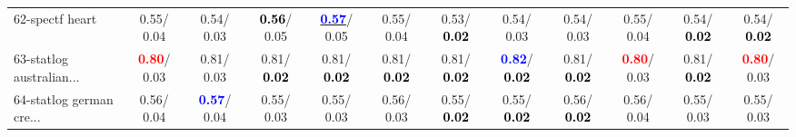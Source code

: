 \begin{table}[h]
\begin{center}
{\begin{tabular}{lc|c|c|c|c|c|c|c|c|c|c}
62-spectf heart &   0.55/  0.04 &   0.54/  0.03 & \textcolor{black}{\textbf{  0.56}}/  0.05 & \underline{\textcolor{blue}{\textbf{  0.57}}}/  0.05 &   0.55/  0.04 &   0.53/\textcolor{black}{\textbf{  0.02}} &   0.54/  0.03 &   0.54/  0.03 &   0.55/  0.04 &   0.54/\textcolor{black}{\textbf{  0.02}} &   0.54/\textcolor{black}{\textbf{  0.02}} \\
63-statlog australian... & \textcolor{red}{\textbf{  0.80}}/  0.03 &   0.81/  0.03 &   0.81/\textcolor{black}{\textbf{  0.02}} &   0.81/\textcolor{black}{\textbf{  0.02}} &   0.81/\textcolor{black}{\textbf{  0.02}} &   0.81/\textcolor{black}{\textbf{  0.02}} & \textcolor{blue}{\textbf{  0.82}}/\textcolor{black}{\textbf{  0.02}} &   0.81/\textcolor{black}{\textbf{  0.02}} & \textcolor{red}{\textbf{  0.80}}/  0.03 &   0.81/\textcolor{black}{\textbf{  0.02}} & \textcolor{red}{\textbf{  0.80}}/  0.03 \\
64-statlog german cre... &   0.56/  0.04 & \textcolor{blue}{\textbf{  0.57}}/  0.04 &   0.55/  0.03 &   0.55/  0.03 &   0.56/  0.03 &   0.55/\textcolor{black}{\textbf{  0.02}} &   0.55/\textcolor{black}{\textbf{  0.02}} &   0.56/\textcolor{black}{\textbf{  0.02}} &   0.56/  0.04 &   0.55/  0.03 &   0.55/  0.03 \\\end{tabular}
}\label{strats1aSVM}
\end{center}
\end{table}
